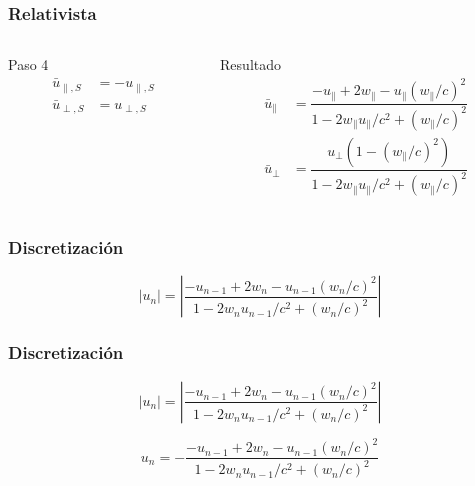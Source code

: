 \documentclass{beamer}
\begin{document}
\begin{frame}[t]
    \frametitle[prueb1]{Relativista}
    \begin{columns}
        \begin{column}{0.5\textwidth}
            \begin{block}{Paso 4}
                \begin{align*}
                    \bar{u}_{\parallel, S} &= -u_{\parallel, S} \\[9.5mm]
                    \bar{u}_{\perp, S} &= u_{\perp, S}
                \end{align*}
                \vspace{2.2mm}
            \end{block}
        \end{column}
        \begin{column}{0.5\textwidth}
            \begin{block}{Resultado}
                \begin{align*}
                    \bar{u}_\parallel &= \dfrac{-u_\parallel + 2w_\parallel - u_\parallel(w_\parallel/c)^2}{1 - 2w_\parallel u_\parallel / c^2 + (w_\parallel/c)^2} \\[5mm]
                    \bar{u}_\perp &= \dfrac{u_\perp\left(1 - (w_\parallel/c)^2\right)}{1 - 2w_\parallel u_\parallel / c^2 + (w_\parallel/c)^2}
                \end{align*}
            \end{block}
        \end{column}
    \end{columns}
\end{frame}

\begin{frame}
    \frametitle[prueb1]{Discretización}
    \begin{equation*}
        \left| u_n \right| = \left|  \dfrac{-u_{n-1} + 2w_n - u_{n-1}(w_n/c)^2}{1 - 2w_n u_{n-1}/c^2 + (w_n/c)^2} \right|
    \end{equation*}
\end{frame}

\begin{frame}
    \frametitle[prueb1]{Discretización}
    \begin{equation*}
        \left| u_n \right| = \left|  \dfrac{-u_{n-1} + 2w_n - u_{n-1}(w_n/c)^2}{1 - 2w_n u_{n-1}/c^2 + (w_n/c)^2} \right|
    \end{equation*}
    \begin{equation*}
        u_n = -\dfrac{-u_{n-1} + 2w_n - u_{n-1}(w_n/c)^2}{1 - 2w_n u_{n-1}/c^2 + (w_n/c)^2}
    \end{equation*}
\end{frame}
\end{document}
